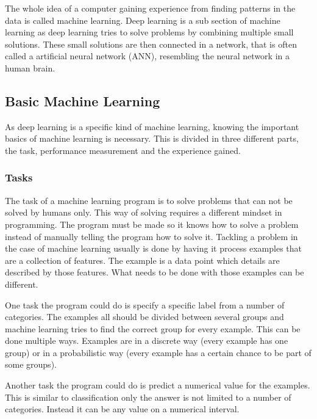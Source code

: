 \documentclass[10pt,a4paper]{report}
\begin{document}
	The whole idea of a computer gaining experience from finding patterns in 
	the data is called machine learning. Deep learning is a sub section of 
	machine learning as deep learning tries to solve problems by combining 
	multiple small solutions. These small solutions are then connected in a 
	network, that is often called a artificial neural network (ANN), resembling 
	the neural network in a human brain.\cite{Goodfellow-et-al-2016}
	
	\clearpage
	
	\subsection{Basic Machine Learning}
	\label{subsec:MachineLearning}
	
	As deep learning is a specific kind of machine learning, knowing the 
	important basics of machine learning is necessary. This is divided in three 
	different parts, the task, performance measurement and the experience 
	gained.\cite{Goodfellow-et-al-2016}
	
	\subsubsection{Tasks}
	
	The task of a machine learning program is to solve problems that can not be 
	solved by humans only. This way of solving requires a different mindset in 
	programming. The program must be made so it knows how to solve a problem 
	instead of manually telling the program how to solve it. Tackling a problem 
	in the case of machine learning usually is done by having it process 
	examples that are a collection of features. The example is a data point 
	which details are described by those features. What needs to be done with 
	those examples can be different.\cite{Goodfellow-et-al-2016}
	
	One task the program could do is specify a specific label from a number of 
	categories. The examples all should be divided between several groups and 
	machine learning tries to find the correct group for every example. This 
	can be done multiple ways. Examples are in a discrete way (every example 
	has one group) or in a probabilistic way (every example has a certain 
	chance to be part of some groups).\cite{Goodfellow-et-al-2016}
	
	Another task the program could do is predict a numerical value for the 
	examples. This is similar to classification only the answer is not limited 
	to a number of categories. Instead it can be any value on a numerical 
	interval. \cite{Goodfellow-et-al-2016}
	
\end{document}
